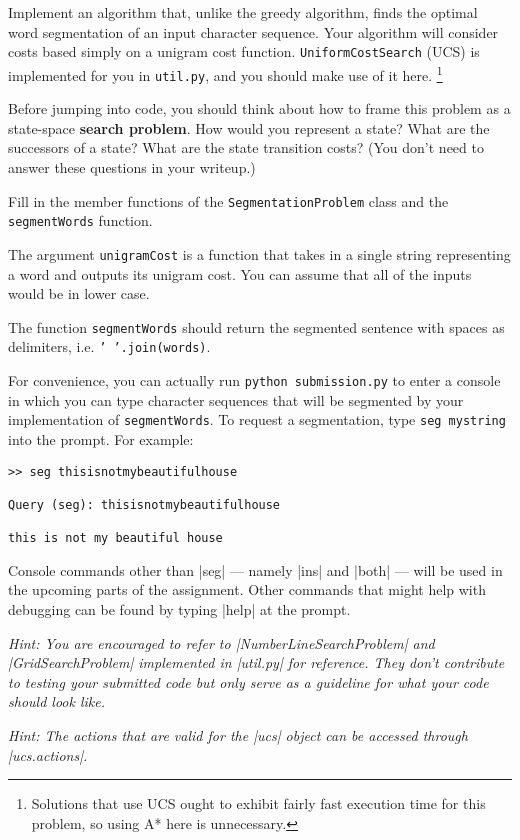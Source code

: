 \item {}
Implement an algorithm that, unlike the greedy algorithm, finds the optimal word
segmentation of an input character sequence. Your algorithm will consider costs
based simply on a unigram cost function. {\tt UniformCostSearch} (UCS) is
implemented for you in {\tt util.py}, and you should make use of it here.
\footnote{Solutions that use UCS ought to exhibit fairly fast execution time for
this problem, so using A* here is unnecessary.}

Before jumping into code, you should think about how to frame this problem as a
state-space {\bf search problem}.  How would you represent a state?  What are
the successors of a state?  What are the state transition costs?  (You don't
need to answer these questions in your writeup.)

Fill in the member functions of the {\tt SegmentationProblem} class and the
{\tt segmentWords} function.

The argument {\tt unigramCost} is a function that takes in a single string
representing a word and outputs its unigram cost. You can assume that all of the
inputs would be in lower case.

The function {\tt segmentWords} should return the segmented sentence with spaces
as delimiters, i.e. {\tt ' '.join(words)}.

For convenience, you can actually run {\tt python submission.py} to enter a
console in which you can type character sequences that will be segmented by your
implementation of {\tt segmentWords}.  To request a segmentation, type
{\tt seg mystring} into the prompt.  For example:

\begin{lstlisting}
>> seg thisisnotmybeautifulhouse

Query (seg): thisisnotmybeautifulhouse

this is not my beautiful house
\end{lstlisting}

Console commands other than |seg| --- namely |ins| and |both| --- will be used
in the upcoming parts of the assignment.  Other commands that might help with
debugging can be found by typing |help| at the prompt.

{\em Hint: You are encouraged to refer to |NumberLineSearchProblem| and
|GridSearchProblem| implemented in |util.py| for reference. They don't
contribute to testing your submitted code but only serve as a guideline for what
your code should look like.}

{\em Hint: The actions that are valid for the |ucs| object can be
accessed through |ucs.actions|.}
